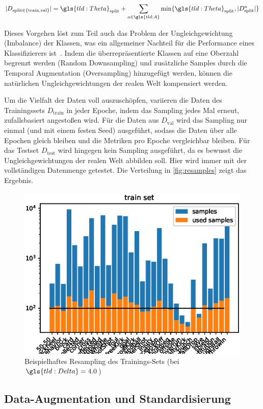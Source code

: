 \begin{equation}
    \label{eq:limit}
    | D_{\text{split} \in \{\text{train}, \text{val}\}} | = \gls{tld:Theta}_\text{split} + \sum\limits_{a \in \gls{tld:A}} \min \{ \gls{tld:Theta}_\text{split}, |D^a_\text{split}| \}
\end{equation}

Dieses Vorgehen löst zum Teil auch das Problem der Ungleichgewichtung (Imbalance) der Klassen, was ein allgemeiner Nachteil für die Performance eines Klassifizierers ist~\cite{Giancola18, Burkov19}.
Indem die überrepräsentierte Klassen auf eine Oberzahl begrenzt werden (Random Downsampling) und zusätzliche Samples durch die Temporal Augmentation (Oversampling) hinzugefügt werden, können die natürlichen Ungleichgewichtungen der realen Welt kompensiert werden.

Um die Vielfalt der Daten voll auszuschöpfen, variieren die Daten des Trainingssets $D_{\text{train}}$ in jeder Epoche, indem das Sampling jedes Mal erneut, zufallsbasiert angestoßen wird.
Für die Daten aus $D_\text{val}$ wird das Sampling nur einmal (und mit einem festen Seed) ausgeführt, sodass die Daten über alle Epochen gleich bleiben und die Metriken pro Epoche vergleichbar bleiben.
Für das Testset $D_\text{test}$ wird hingegen kein Sampling ausgeführt, da es bewusst die Ungleichgewichtungen der realen Welt abbilden soll.
Hier wird immer mit der vollständigen Datenmenge getestet.
Die Verteilung in \autoref{fig:resamples} zeigt das Ergebnis.

\begin{figure}
    \centering
    \includegraphics[width=.6\linewidth]{img/data-plots/4sec/class_distribution_used_samples_train_202010-1419-3803.eps}
    \caption{Beispielhaftes Resampling des Trainings-Sets (bei $\gls{tld:Delta} = 4.0$)}
    \label{fig:resamples}
\end{figure}

\subsection{Data-Augmentation und Standardisierung}
\label{subsec:data-augmentation}


